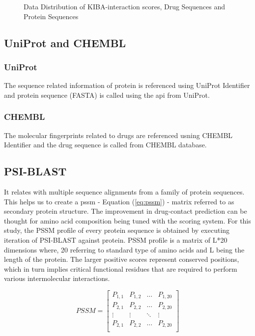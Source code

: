 \begin{figure}
         \caption{Data Distribution of KIBA-interaction scores, Drug Sequences and Protein Sequences}
         \label{fig:kiba_drug_protein}
\end{figure}

\subsection{UniProt and CHEMBL }

\subsubsection{UniProt} 
The sequence related information of protein is referenced using UniProt Identifier and protein sequence (FASTA) is called using the api from UniProt. \cite{UniProtConsortium2018}


\subsubsection{CHEMBL}
The molecular fingerprints related to drugs are referenced usning CHEMBL Identifier and the drug sequence is called from CHEMBL database. \cite{Gaulton2017}

\subsection{PSI-BLAST}
It relates with multiple sequence alignments from a family of protein sequences\cite{Schaffer2001}. This helps us to create a \acrshort{pssm} - Equation (\ref{eq:pssm}) - matrix referred to as secondary protein structure. The improvement in drug-contact prediction can be thought for amino acid composition being tuned with the scoring system. For this study, the PSSM profile of every protein sequence is obtained by executing iteration of PSI-BLAST against \cite[KEGG]{Schaffer2001} protein. PSSM profile is a matrix of L*20 dimensions where, 20 referring to standard type of amino acids and L being the length of the protein. The larger positive scores represent conserved positions, which in turn implies critical functional residues that are required to perform various intermolecular interactions.\cite[PSSM]{Schaffer2001}

\begin{equation}
  PSSM = \begin{bmatrix}
    P_{1,1} & P_{1,2} & \dots & P_{1,20} \\
    P_{2,1} & P_{2,2} & \dots & P_{2,20} \\
    \vdots  & \vdots  & \ddots & \vdots \\
    P_{2,1} & P_{2,2} & \dots & P_{2,20} \\
  \end{bmatrix}
  \label{eq:pssm}
\end{equation}

